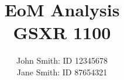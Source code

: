 \title{
EoM Analysis
\\
 GSXR 1100 
\\
}
\author{
John Smith: ID 12345678
\\
Jane Smith: ID 87654321
\\
}
